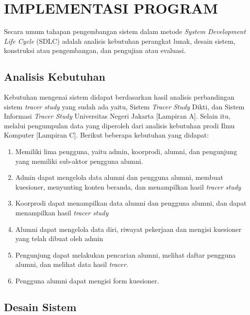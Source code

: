
\chapter{IMPLEMENTASI PROGRAM}

Secara umum tahapan pengembangan sistem dalam metode \emph{System Development Life Cycle} (SDLC) adalah analisis kebutuhan perangkat lunak, desain sistem, konstruksi atau pengembangan, dan pengujian atau evaluasi.


\section{Analisis Kebutuhan}

Kebutuhan mengenai sistem didapat berdasarkan hasil analisis perbandingan sistem \textit{tracer study} yang sudah ada yaitu, Sistem \textit{Tracer Study} Dikti, dan Sistem Informasi \textit{Tracer Study} Universitas Negeri Jakarta [Lampiran A]. Selain itu, melalui pengumpulan data yang diperoleh dari analisis kebutuhan prodi Ilmu Komputer [Lampiran C]. Berikut beberapa kebutuhan yang didapat:
\begin{enumerate}
	\item Memiliki lima pengguna, yaitu admin, koorprodi, alumni, dan pengunjung yang memiliki sub-aktor pengguna alumni. 
	\item Admin dapat mengelola data alumni dan pengguna alumni, membuat kuesioner, menyunting konten beranda, dan menampilkan hasil \textit{tracer study}
	\item Koorprodi dapat menampilkan data alumni dan pengguna alumni, dan dapat menampilkan hasil \textit{tracer study}
	\item Alumni dapat mengelola data diri, riwayat pekerjaan dan mengisi kuesioner yang telah dibuat oleh admin
	\item Pengunjung dapat melakukan pencarian alumni, melihat daftar pengguna alumni, dan melihat data hasil \textit{tracer}. 
	\item Pengguna alumni dapat mengisi form kuesioner.
\end{enumerate}

\section{Desain Sistem}

